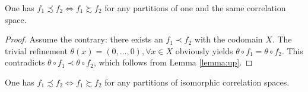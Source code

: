 \begin{lemma}
	One has $f_1 \precsim f_2 \Leftrightarrow f_1 \succsim f_2$ for any partitions of one and the same correlation space. %
\end{lemma}

\begin{proof}
	Assume the contrary: there exists an $f_1 \prec f_2$ with the codomain $X$. The trivial refinement $\theta(x) = (0, \ldots, 0), \forall x \in X$ obviously yields $\theta \circ f_1 = \theta \circ f_2$. This contradicts $\theta \circ f_1 \prec \theta \circ f_2$, which follows from Lemma \ref{lemma:up}. %
\end{proof}

\begin{corollary} \label{cor:sym}
	One has $f_1 \precsim f_2 \Leftrightarrow f_1 \succsim f_2$ for any partitions of isomorphic correlation spaces. %
\end{corollary}

